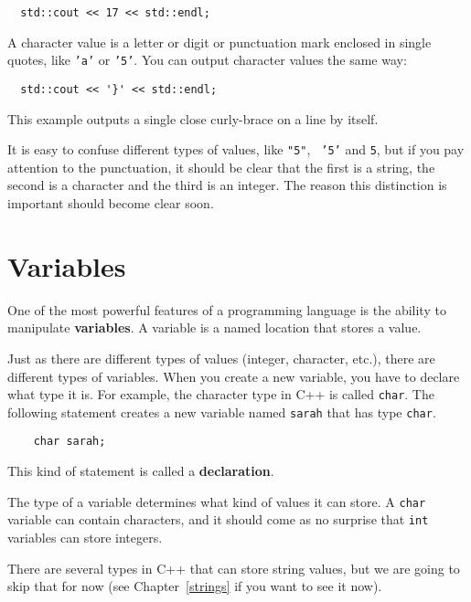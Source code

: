 \begin{lstlisting}
  std::cout << 17 << std::endl;
\end{lstlisting}

A character value is a letter or digit or punctuation mark
enclosed in single quotes, like {\tt 'a'} or {\tt '5'}.
You can output character values the same way:


\begin{lstlisting}
  std::cout << '}' << std::endl;
\end{lstlisting}

This example outputs a single close curly-brace on a line
by itself.

It is easy to confuse different types of values, like {\tt "5"}, {\tt
'5'} and {\tt 5}, but if you pay attention to the punctuation, it
should be clear that the first is a string, the second is a character
and the third is an integer.  The reason this distinction is important
should become clear soon.

\section {Variables}

One of the most powerful features of a programming language is the
ability to manipulate {\bf variables}.  A variable is a named location
that stores a value.  

Just as there are different types of values (integer, character,
etc.), there are different types of variables.  When you create a new
variable, you have to declare what type it is.  For example, the
character type in C++ is called {\tt char}.  The following statement
creates a new variable named {\tt sarah} that has type {\tt char}.

\begin{lstlisting}
    char sarah;
\end{lstlisting}

This kind of statement is called a {\bf declaration}.

The type of a variable determines what kind of values it can
store.  A {\tt char} variable can contain characters, and it should
come as no surprise that {\tt int} variables can store integers.

There are several types in C++ that can store string values, but we
are going to skip that for now (see Chapter~\ref{strings} if you want to see it now).


